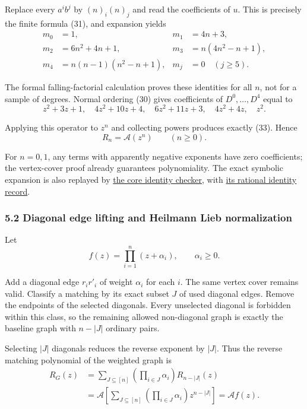 \documentclass[
  11pt,
  a4paper,
]{article}
\begin{document}
Replace every \(a^ib^j\) by \((n)_i(n)_j\) and read the coefficients of
\(u\). This is precisely the finite formula (31), and expansion yields
\nopagebreak
\[
\begin{aligned}
m_0&=1,&m_1&=4n+3,\\
m_2&=6n^2+4n+1,&m_3&=n(4n^2-n+1),\\
m_4&=n(n-1)(n^2-n+1),&m_j&=0\quad(j\geq5).
\end{aligned}\tag{33}
\]

The formal falling-factorial calculation proves these identities for all
\(n\), not for a sample of degrees. Normal ordering (30) gives
coefficients of \(D^0,\ldots,D^4\) equal to
\nopagebreak
\[
z^2+3z+1,\quad
4z^2+10z+4,\quad
6z^2+11z+3,\quad
4z^2+4z,\quad z^2.
\]

Applying this operator to \(z^n\) and collecting powers produces exactly
(33). Hence
\nopagebreak
\[
R_n=\mathcal A(z^n)\qquad(n\geq0).\tag{34}
\]

For \(n=0,1\), any terms with apparently negative exponents have zero
coefficients; the vertex-cover proof already guarantees polynomiality.
The exact symbolic expansion is also replayed by
\href{certify_short_branch_core.py}{the core identity checker}, with
\href{certify_short_branch_core.json}{its rational identity record}.

\subsubsection{5.2 Diagonal edge lifting and Heilmann Lieb
normalization}\label{diagonal-edge-lifting-and-heilmann-lieb-normalization}

Let
\nopagebreak
\[
f(z)=\prod_{i=1}^n(z+\alpha_i),\qquad \alpha_i\geq0.
\]

Add a diagonal edge \(r_ir'_i\) of weight \(\alpha_i\) for each \(i\).
The same vertex cover remains valid. Classify a matching by its exact
subset \(J\) of used diagonal edges. Remove the endpoints of the
selected diagonals. Every unselected diagonal is forbidden within this
class, so the remaining allowed non-diagonal graph is exactly the
baseline graph with \(n-|J|\) ordinary pairs.

Selecting \(|J|\) diagonals reduces the reverse exponent by \(|J|\).
Thus the reverse matching polynomial of the weighted graph is
\nopagebreak
\[
\begin{aligned}
R_G(z)
&=\sum_{J\subseteq[n]}\left(\prod_{i\in J}\alpha_i\right)R_{n-|J|}(z)\\
&=\mathcal A\left[\sum_{J\subseteq[n]}
\left(\prod_{i\in J}\alpha_i\right)z^{n-|J|}\right]
=\mathcal A f(z).
\end{aligned}\tag{35}
\]
\end{document}
